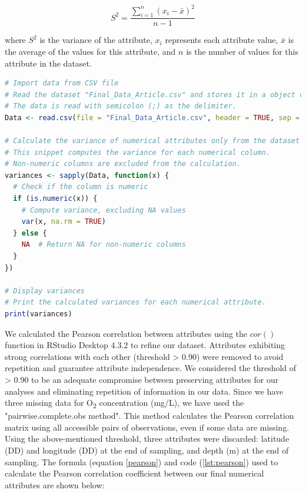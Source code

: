 \begin{equation}\label{variance}
    S^2 = \frac{\sum_{i=1}^{n} (x_i - \bar{x})^2}{n-1}
\end{equation}

where $S^2$ is the variance of the attribute, $x_i$ represents each attribute value, $\bar{x}$ is the average of the values for this attribute, and $n$ is the number of values for this attribute in the dataset.

\begin{lstlisting}[label=lst:variance,language=R,caption=RStudio script to calculate the variance of each numerical attributes in our final dataset]
# Import data from CSV file
# Read the dataset "Final_Data_Article.csv" and stores it in a object called Data.
# The data is read with semicolon (;) as the delimiter.
Data <- read.csv(file = "Final_Data_Article.csv", header = TRUE, sep = ";")

# Calculate the variance of numerical attributes only from the dataset
# This snippet computes the variance for each numerical column.
# Non-numeric columns are excluded from the calculation.
variances <- sapply(Data, function(x) {
  # Check if the column is numeric
  if (is.numeric(x)) {
    # Compute variance, excluding NA values
    var(x, na.rm = TRUE)
  } else {
    NA  # Return NA for non-numeric columns
  }
})

# Display variances
# Print the calculated variances for each numerical attribute.
print(variances)
\end{lstlisting}

We calculated the Pearson correlation between attributes using the $cor()$ function in RStudio Desktop 4.3.2 to refine our dataset. Attributes exhibiting strong correlations with each other (threshold > 0.90) were removed to avoid repetition and guarantee attribute independence. We considered the threshold of > 0.90 to be an adequate compromise between preserving attributes for our analyses and eliminating repetition of information in our data. Since we have three missing data for O\textsubscript{2} concentration (mg/L), we have used the "pairwise.complete.obs method". This method calculates the Pearson correlation matrix using all accessible pairs of observations, even if some data are missing. Using the above-mentioned threshold, three attributes were discarded: latitude (DD) and longitude (DD) at the end of sampling, and depth (m) at the end of sampling. The formula (equation \ref{pearson}) and code (\autoref{lst:pearson}) used to calculate the Pearson correlation coefficient between our final numerical attributes are shown below:

